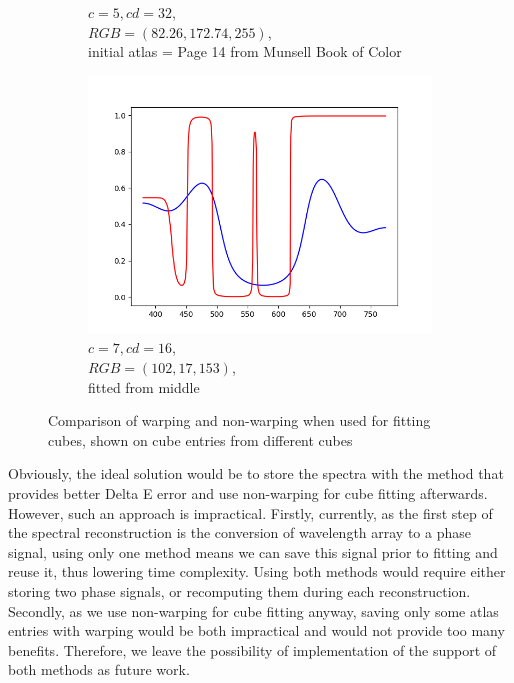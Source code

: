 \begin{figure}[t]
\begin{subfigure}[t]{0.31\textwidth}
		\caption{$c=5, cd=32$,\\$RGB=(82.26, 172.74, 255)$,\\initial atlas = Page 14 from Munsell Book of Color}
		\label{fig:resultsTechniqueOpt_m5_cd32}
	\end{subfigure}
	\begin{subfigure}[t]{0.31\textwidth}
		\includegraphics[width=\linewidth]{img/resultsTechniqueOpt_m7_cd16.png}
		\caption{$c=7, cd=16$,\\$RGB=(102, 17, 153)$,\\ fitted from middle}
		\label{fig:resultsTechniqueOpt_m7_cd16}
	\end{subfigure} 
	\caption{Comparison of warping and non-warping when used for fitting cubes, shown on cube entries from different cubes}
	\label{fig:resultsTechnique_optimizer}
\end{figure}

Obviously, the ideal solution would be to store the spectra with the method that provides better Delta E error and use non-warping for cube fitting afterwards. However, such an approach is impractical. Firstly, currently, as the first step of the spectral reconstruction is the conversion of wavelength array to a phase signal, using only one method means we can save this signal prior to fitting and reuse it, thus lowering time complexity. Using both methods would require either storing two phase signals, or recomputing them during each reconstruction. Secondly, as we use non-warping for cube fitting anyway, saving only some atlas entries with warping would be both impractical and would not provide too many benefits. Therefore, we leave the possibility of implementation of the support of both methods as future work.

